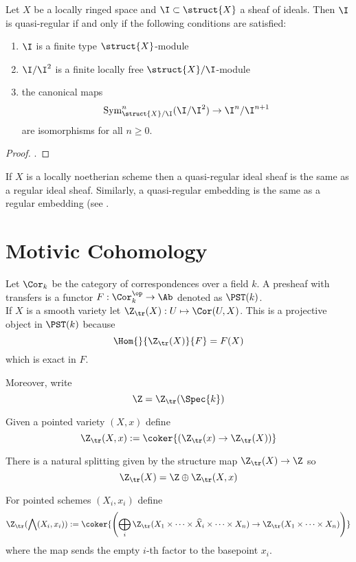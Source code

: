 \documentclass[12pt]{article}
\begin{document}
\begin{lemma}
Let $X$ be a locally ringed space and $\I \subset \struct{X}$ a sheaf of ideals. Then $\I$ is quasi-regular if and only if the following conditions are satisfied:
\begin{enumerate}
\item $\I$ is a finite type $\struct{X}$-module
\item $\I / \I^2$ is a finite locally free $\struct{X} / \I$-module
\item the canonical maps
\[ \mathrm{Sym}^n_{\struct{X}/ \I}(\I / \I^2) \to \I^n / \I^{n+1} \]
are isomorphisms for all $n \ge 0$.
\end{enumerate}
\end{lemma}

\begin{proof}
.
\end{proof}

\begin{rmk}
If $X$ is a locally noetherian scheme then a quasi-regular ideal sheaf is the same as a regular ideal sheaf. Similarly, a quasi-regular embedding is the same as a regular embedding (see .
\end{rmk}

\section{Motivic Cohomology}

Let $\Cor_k$ be the category of correspondences over a field $k$. A presheaf with transfers is a functor $F : \Cor_k^{\op} \to \Ab$ denoted as $\PST(k)$. 
\bigskip\\
If $X$ is a smooth variety let $\Z_{\tr}(X) : U \mapsto \Cor(U, X)$. This is a projective object in $\PST(k)$ because
\[ \Hom{}{\Z_{\tr}(X)}{F} = F(X) \]
which is exact in $F$.


 Moreover, write
\[ \Z = \Z_{\tr}(\Spec{k}) \]

\begin{defn}
Given a pointed variety $(X, x)$ define 
\[ \Z_{\tr}(X, x) := \coker{(\Z_{\tr}(x) \to \Z_{\tr}(X))} \]
\end{defn}

There is a natural splitting given by the structure map $\Z_{\tr}(X) \to \Z$ so 
\[ \Z_{\tr}(X) = \Z \oplus \Z_{\tr}(X, x) \]

\begin{defn}
For pointed schemes $(X_i, x_i)$ define
\[ \Z_{\tr}( \bigwedge (X_i, x_i)) := \coker{\left( \bigoplus_i \Z_{\tr}(X_1 \times \cdots \times \widehat{X}_i \times \cdots \times X_n) \to \Z_{\tr}(X_1 \times \cdots \times X_n) \right) } \]
where the map sends the empty $i$-th factor to the basepoint $x_i$. 
\end{defn}
\end{document}
